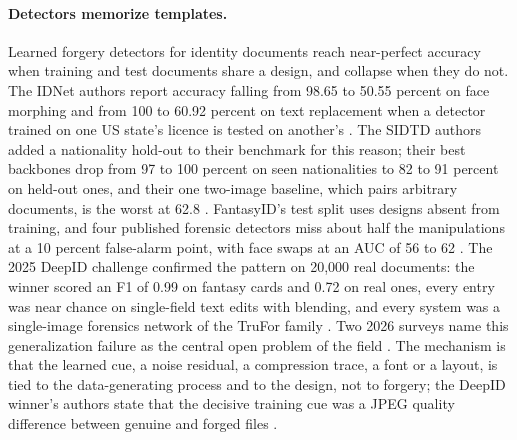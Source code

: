 \documentclass[11pt,a4paper]{article}
\begin{document}
\paragraph{Detectors memorize templates.} Learned forgery detectors for identity documents reach near-perfect accuracy when training and test documents share a design, and collapse when they do not. The IDNet authors report accuracy falling from 98.65 to 50.55 percent on face morphing and from 100 to 60.92 percent on text replacement when a detector trained on one US state's licence is tested on another's \cite{guan2024idnet}. The SIDTD authors added a nationality hold-out to their benchmark for this reason; their best backbones drop from 97 to 100 percent on seen nationalities to 82 to 91 percent on held-out ones, and their one two-image baseline, which pairs arbitrary documents, is the worst at 62.8 \cite{boned2024sidtd}. FantasyID's test split uses designs absent from training, and four published forensic detectors miss about half the manipulations at a 10 percent false-alarm point, with face swaps at an AUC of 56 to 62 \cite{korshunov2025fantasyid}. The 2025 DeepID challenge confirmed the pattern on 20,000 real documents: the winner scored an F1 of 0.99 on fantasy cards and 0.72 on real ones, every entry was near chance on single-field text edits with blending, and every system was a single-image forensics network of the TruFor family \cite{korshunov2025deepid,guillaro2023trufor}. Two 2026 surveys name this generalization failure as the central open problem of the field \cite{das2026survey,ruiz2025review}. The mechanism is that the learned cue, a noise residual, a compression trace, a font or a layout, is tied to the data-generating process and to the design, not to forgery; the DeepID winner's authors state that the decisive training cue was a JPEG quality difference between genuine and forged files \cite{korshunov2025deepid}.
\end{document}
